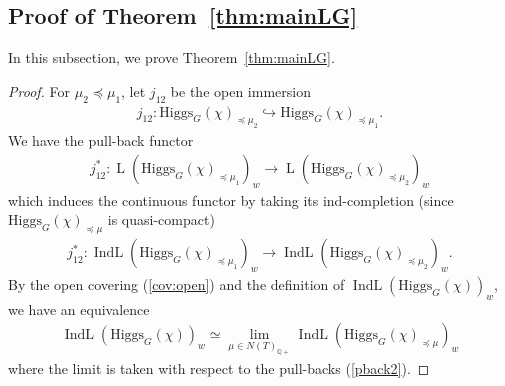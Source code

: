 \documentclass [11pt,oneside,a4paper,mathscr]{amsart}
\theoremstyle{definition}
\renewcommand{\geq}{\geqslant}
\newcommand{\LL}{\operatorname{L}}
\newcommand{\IndL}{\operatorname{IndL}}
\newcommand{\GL}{\operatorname{GL}}
\newcommand{\Hig}{\mathrm{Higgs}}
\begin{document}
\subsection{Proof of Theorem~\ref{thm:mainLG}}\label{subsec:proofofthm}
In this subsection, we prove Theorem~\ref{thm:mainLG}. 
\begin{proof}
For $\mu_2 \preceq \mu_1$, let $j_{12}$ be the open immersion 
\begin{align}\label{map:j12}
    j_{12} \colon \Hig_G(\chi)_{\preceq \mu_2} \hookrightarrow
    \Hig_G(\chi)_{\preceq \mu_1}. 
\end{align}
We have the pull-back functor
\begin{align}\label{pback2.0}
    j_{12}^{\ast} \colon \LL(\Hig_G(\chi)_{\preceq \mu_1})_{w}
    \to \LL(\Hig_G(\chi)_{\preceq \mu_2})_{w}
\end{align}
which induces the continuous functor by taking its ind-completion
(since $\Hig_G(\chi)_{\preceq \mu}$ is quasi-compact)
\begin{align}\label{pback2}
    j_{12}^{\ast} \colon \IndL(\Hig_G(\chi)_{\preceq \mu_1})_{w}
    \to \IndL(\Hig_G(\chi)_{\preceq \mu_2})_{w}. 
\end{align}
By the open covering (\ref{cov:open})
and the definition of 
$\IndL(\Hig_G(\chi))_{w}$, 
we have an equivalence 
\begin{align*}
\IndL(\Hig_G(\chi))_w \simeq \lim_{\mu\in N(T)_{\mathbb{Q}+}}\IndL(\Hig_G(\chi)_{\preceq \mu})_w
\end{align*}
where the limit is taken with respect to the pull-backs (\ref{pback2}). 


 




\end{proof}
\end{document}

